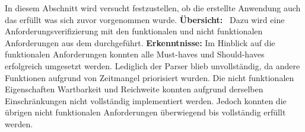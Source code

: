 %
In diesem Abschnitt wird versucht festzustellen, ob die erstellte Anwendung auch das erfüllt was sich zuvor vorgenommen wurde.\newline%
%
\textbf{Übersicht:} %
Dazu wird eine Anforderungsverifizierung mit den funktionalen und nicht funktionalen Anforderungen aus dem  durchgeführt.\newline%
%
\textbf{Erkenntnisse:}\newline%
	Im Hinblick auf die funktionalen Anforderungen konnten alle \glqq Must-haves\grqq{} und \glqq Should-haves\grqq{} erfolgreich umgesetzt werden. Lediglich der Parser blieb unvollständig, da andere Funktionen aufgrund von Zeitmangel priorisiert wurden. %
	Die nicht funktionalen Eigenschaften \glqq Wartbarkeit\grqq{} und \glqq Reichweite\grqq{} konnten aufgrund derselben Einschränkungen nicht vollständig implementiert werden. Jedoch konnten die übrigen nicht funktionalen Anforderungen überwiegend bis vollständig erfüllt werden.%
%
%
%
%	
%
